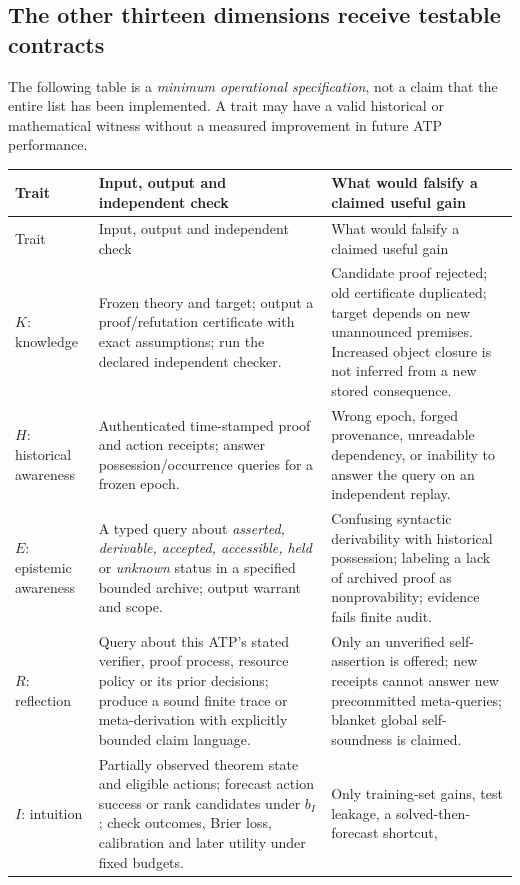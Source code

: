 \documentclass[11pt,letterpaper]{article}
\theoremstyle{definition}
\theoremstyle{plain}
\theoremstyle{definition}
\begin{document}
\subsection{The other thirteen dimensions receive testable contracts}
The following table is a \emph{minimum operational specification}, not a
claim that the entire list has been implemented. A trait may have a valid
historical or mathematical witness without a measured improvement in future
ATP performance.
\small
\begin{longtable}{@{}p{.13\linewidth}p{.40\linewidth}p{.40\linewidth}@{}}
\toprule
Trait & Input, output and independent check & What would falsify a claimed useful gain\\\midrule
\endfirsthead
\toprule Trait & Input, output and independent check & What would falsify a claimed useful gain\\\midrule
\endhead
$K$: knowledge & Frozen theory and target; output a proof/refutation
certificate with exact assumptions; run the declared independent checker. &
Candidate proof rejected; old certificate duplicated; target depends on
new unannounced premises. Increased object closure is not inferred from
a new stored consequence.\\[3pt]
$H$: historical awareness & Authenticated time-stamped proof and action
receipts; answer possession/occurrence queries for a frozen epoch. &
Wrong epoch, forged provenance, unreadable dependency, or inability to
answer the query on an independent replay.\\[3pt]
$E$: epistemic awareness & A typed query about \emph{asserted, derivable,
accepted, accessible, held} or \emph{unknown} status in a specified
bounded archive; output warrant and scope. &
Confusing syntactic derivability with historical possession; labeling a
lack of archived proof as nonprovability; evidence fails finite audit.\\[3pt]
$R$: reflection & Query about this ATP's stated verifier, proof process,
resource policy or its prior decisions; produce a sound finite trace
or meta-derivation with explicitly bounded claim language. &
Only an unverified self-assertion is offered; new receipts cannot answer
new precommitted meta-queries; blanket global self-soundness is claimed.\\[3pt]
$I$: intuition & Partially observed theorem state and eligible actions;
forecast action success or rank candidates under $b_I$; check outcomes,
Brier loss, calibration and later utility under fixed budgets. &
Only training-set gains, test leakage, a solved-then-forecast shortcut,

\end{longtable}
\end{document}
